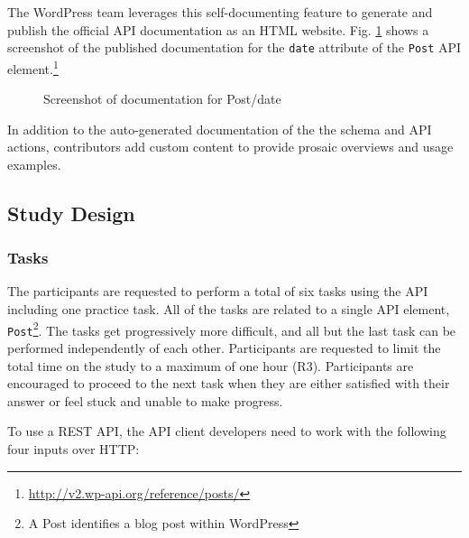 \documentclass[conference]{IEEEtran}
\begin{document}
The WordPress team leverages this self-documenting feature to generate and publish the official API documentation as an HTML website. Fig. \ref{fig:schema} shows a screenshot of the published documentation for the \lstinline{date} attribute of the \lstinline{Post} API element.\footnote{\url{http://v2.wp-api.org/reference/posts/}}

\begin{figure}[h!]
\begin{center}
\end{center}
\caption{Screenshot of documentation for Post/date}
\label{fig:schema}
\end{figure}

In addition to the auto-generated documentation of the the schema and API actions, contributors add custom content to provide prosaic overviews and usage examples.



\subsection{Study Design} %
\subsubsection{Tasks} %

The participants are requested to perform a total of six tasks using the API including one practice task. All of the tasks are related to a single API element, \lstinline{Post}\footnote{A Post identifies a blog post within WordPress}. The tasks get progressively more difficult, and all but the last task can be performed independently of each other. Participants are requested to limit the total time on the study to a maximum of one hour (R3). Participants are encouraged to proceed to the next task when they are either satisfied with their answer or feel stuck and unable to make progress.

To use a REST API, the API client developers need to work with the following four inputs over HTTP:
\end{document}
